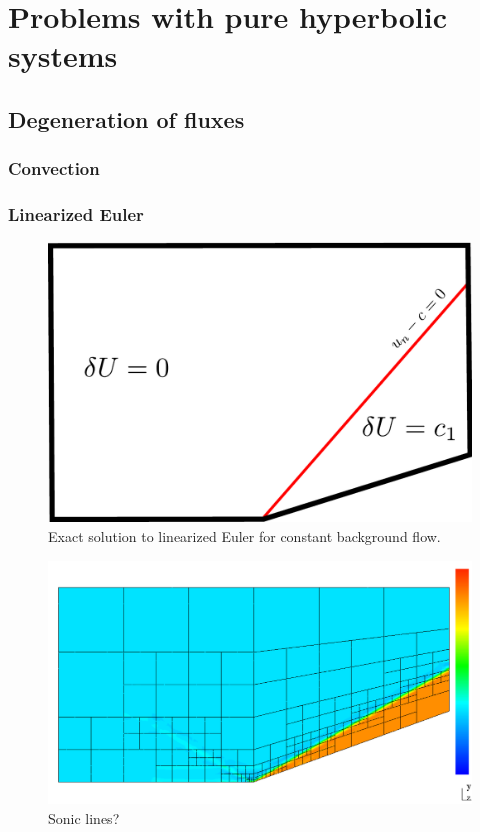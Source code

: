 \chapter{Problems with pure hyperbolic systems}

\section{Degeneration of fluxes}

\subsection{Convection}


\subsection{Linearized Euler}

\begin{figure}[!h]
\centering
\includegraphics[scale = .5]{figs/linEulerExact.pdf}
\caption{Exact solution to linearized Euler for constant background flow.}
\end{figure}

\begin{figure}[!h]
\centering
\includegraphics[scale = .5]{figs/sonicLines.pdf}
\caption{Sonic lines?}
\end{figure}
